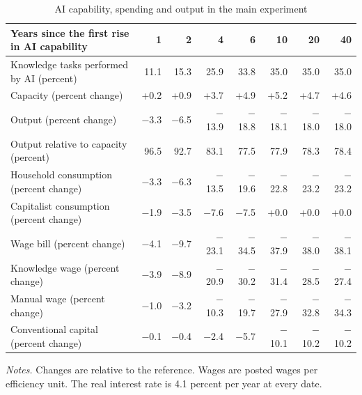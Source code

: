 \begin{table}[htbp]\centering\small
\caption{AI capability, spending and output in the main experiment}\label{tab:aggregates}
\begin{tabularx}{\linewidth}{@{}>{\raggedright\arraybackslash}Xrrrrrrr@{}}\toprule
Years since the first rise in AI capability & 1 & 2 & 4 & 6 & 10 & 20 & 40 \\\midrule
Knowledge tasks performed by AI (percent) & 11.1 & 15.3 & 25.9 & 33.8 & 35.0 & 35.0 & 35.0 \\
Capacity (percent change) & +0.2 & +0.9 & +3.7 & +4.9 & +5.2 & +4.7 & +4.6 \\
Output (percent change) & $-$3.3 & $-$6.5 & $-$13.9 & $-$18.8 & $-$18.1 & $-$18.0 & $-$18.0 \\
Output relative to capacity (percent) & 96.5 & 92.7 & 83.1 & 77.5 & 77.9 & 78.3 & 78.4 \\
Household consumption (percent change) & $-$3.3 & $-$6.3 & $-$13.5 & $-$19.6 & $-$22.8 & $-$23.2 & $-$23.2 \\
Capitalist consumption (percent change) & $-$1.9 & $-$3.5 & $-$7.6 & $-$7.5 & +0.0 & +0.0 & +0.0 \\
Wage bill (percent change) & $-$4.1 & $-$9.7 & $-$23.1 & $-$34.5 & $-$37.9 & $-$38.0 & $-$38.1 \\
Knowledge wage (percent change) & $-$3.9 & $-$8.9 & $-$20.9 & $-$30.2 & $-$31.4 & $-$28.5 & $-$27.4 \\
Manual wage (percent change) & $-$1.0 & $-$3.2 & $-$10.3 & $-$19.7 & $-$27.9 & $-$32.8 & $-$34.3 \\
Conventional capital (percent change) & $-$0.1 & $-$0.4 & $-$2.4 & $-$5.7 & $-$10.1 & $-$10.2 & $-$10.2 \\
\bottomrule\end{tabularx}
\par\smallskip\begin{minipage}{\linewidth}\footnotesize\emph{Notes.} Changes are relative to the reference. Wages are posted wages per efficiency unit. The real interest rate is 4.1 percent per year at every date.\end{minipage}
\end{table}
